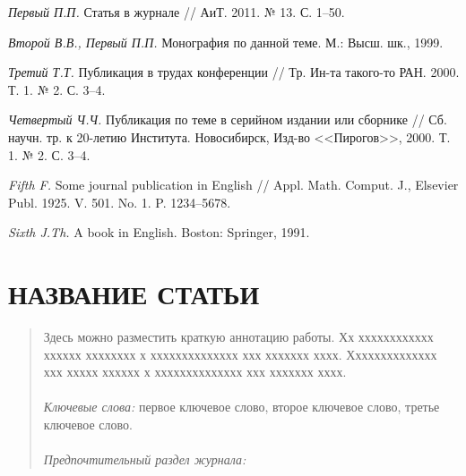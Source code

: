 \documentclass[12pt]{a&t}
\begin{document}
\begin{thebibliography}{10}

{\it Первый П.П.}
Статья в журнале // АиТ. 2011. № 13. С. 1--50.

{\it Второй В.В., Первый П.П.}
Монография по данной теме. М.: Высш. шк., 1999.

{\it Третий Т.Т.}
Публикация в трудах конференции //
Тр. Ин-та такого-то РАН. 2000. Т. 1. № 2. С. 3--4.

{\it Четвертый Ч.Ч.}
Публикация по теме в серийном издании или сборнике //
Сб. научн. тр. к 20-летию Института. Новосибирск, Изд-во <<Пирогов>>, 2000. Т. 1. № 2. С. 3--4.

{\it Fifth F.}
Some journal publication in English //
Appl. Math. Comput. J., Elsevier Publ. 1925. V. 501. No. 1. P. 1234--5678.

{\it Sixth J.Th.}
A book in English. Boston: Springer, 1991.

\end{thebibliography}





\section*{НАЗВАНИЕ СТАТЬИ}

\begin{abstract}
	Здесь можно разместить краткую аннотацию работы. Хх
	хххххххххххх хххххх хххххххх х хххххххххххххх ххх ххххххх хххх.
	Хххххххххххххх ххх ххххх хххххх х хххххххххххххх ххх ххххххх
	хххх.\\
	\\
	\textit{Ключевые слова:} первое ключевое слово, второе ключевое слово, третье ключевое слово.
\\
\\
\textit{Предпочтительный раздел журнала:}
\end{abstract}
\end{document}
